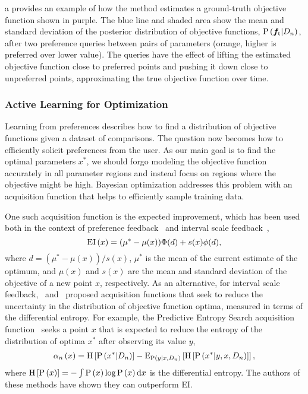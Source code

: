a provides an example of how the method estimates a
ground-truth objective function shown in purple. The blue line and shaded area show
the mean and standard deviation of the posterior distribution of objective
functions, $\prob{\vecf{f}_\tn{t}|D_n}$, after two preference queries between
pairs of parameters (orange, higher is preferred over lower value). The queries
have the effect of lifting the estimated objective function close to preferred
points and pushing it down close to unpreferred points, approximating the true
objective function over time.

\subsubsection{Active Learning for Optimization}
Learning from preferences describes how to find a distribution of objective
functions given a dataset of comparisons. The question now becomes how to
efficiently solicit preferences from the user. As our main goal is to find the
optimal parameters $x^*$, we should forgo modeling the objective function
accurately in all parameter regions and instead focus on regions where the
objective might be high. Bayesian optimization addresses this problem with an
acquisition function that helps to efficiently sample training data.

One such acquisition function is the expected improvement, which has been used
both in the context of preference feedback~\citep{eric2008active} and interval
scale feedback~\citep{jones1998efficient},
\begin{equation}
    \func{EI}{x} = (\mu^* - \mu(x))\Phi(d) + s(x)\phi(d),
    \label{eq:expected_improvement}
\end{equation}
where $d = (\mu^* - \mu(x))/s(x)$, $\mu^*$ is the mean of the current estimate
of the optimum, and $\mu(x)$ and $s(x)$ are the mean and standard deviation of
the objective of a new point $x$, respectively. As an alternative, for interval
scale feedback,~\citep{hennig2012entropy} and~\citep{hernandez2014predictive}
proposed acquisition functions that seek to reduce the uncertainty in the
distribution of objective function optima, measured in terms of the differential
entropy. For example, the Predictive Entropy Search acquisition
function~\citep{hernandez2014predictive} seeks a point $x$ that is expected to
reduce the entropy of the distribution of optima $x^*$ after observing its value
$y$,
\begin{align}
    \alpha_n \left(x \right) = \funcsb{H}{\prob{x^*|D_n}} 
        - \funcsb{E}[\prob{y|x, D_n}]{\funcsb{H}{\prob{x^*|y, x, D_n}}},
    \label{eq:pes_interval_scale}
\end{align}
where $\funcsb{H}{\prob{x}} = - \int \prob{x} \log \prob{x} \tn{d} x$
is the differential entropy. The authors of these methods have shown they can
outperform EI\@. 

